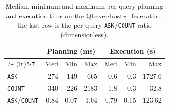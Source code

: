 \begin{table}[t]
	\centering
	\caption{Median, minimum and maximum per-query planning and execution time on the
		QLever-hosted federation; the last row is the per-query \texttt{ASK}/\texttt{COUNT}
		ratio (dimensionless).}
	\label{tab:qlever-ask-count-adhoc}
	\begin{tabular}{lrrrrrr}
		\toprule
		                            & \multicolumn{3}{c}{Planning (ms)} & \multicolumn{3}{c}{Execution (s)} \\
		\cmidrule(lr){2-4}\cmidrule(lr){5-7}
		                            & Med & Min & Max & Med & Min & Max \\
		\midrule
		\texttt{ASK}                & 274 & 149 & 665 & 0.6 & 0.3 & 1727.6 \\
		\texttt{COUNT}              & 340 & 226 & 2183 & 1.8 & 0.3 & 32.8 \\
		\texttt{ASK}/\texttt{COUNT} & 0.84 & 0.07 & 1.04 & 0.79 & 0.15 & 123.62 \\
		\bottomrule
	\end{tabular}
\end{table}
